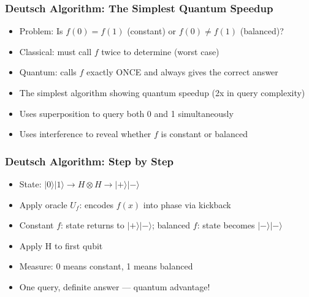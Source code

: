 \begin{frame}[fragile]\frametitle{Deutsch Algorithm: The Simplest Quantum Speedup}
\begin{itemize}
\item Problem: Is $f(0) = f(1)$ (constant) or $f(0) \neq f(1)$ (balanced)?
\item Classical: must call $f$ twice to determine (worst case)
\item Quantum: calls $f$ exactly ONCE and always gives the correct answer
\item The simplest algorithm showing quantum speedup (2x in query complexity)
\item Uses superposition to query both 0 and 1 simultaneously
\item Uses interference to reveal whether $f$ is constant or balanced
\end{itemize}
\end{frame}

\begin{frame}[fragile]\frametitle{Deutsch Algorithm: Step by Step}
\begin{itemize}
\item State: $|0\rangle|1\rangle \to H \otimes H \to |+\rangle|-\rangle$
\item Apply oracle $U_f$: encodes $f(x)$ into phase via kickback
\item Constant $f$: state returns to $|+\rangle|-\rangle$; balanced $f$: state becomes $|-\rangle|-\rangle$
\item Apply H to first qubit
\item Measure: 0 means constant, 1 means balanced
\item One query, definite answer --- quantum advantage!
\end{itemize}
\end{frame}


